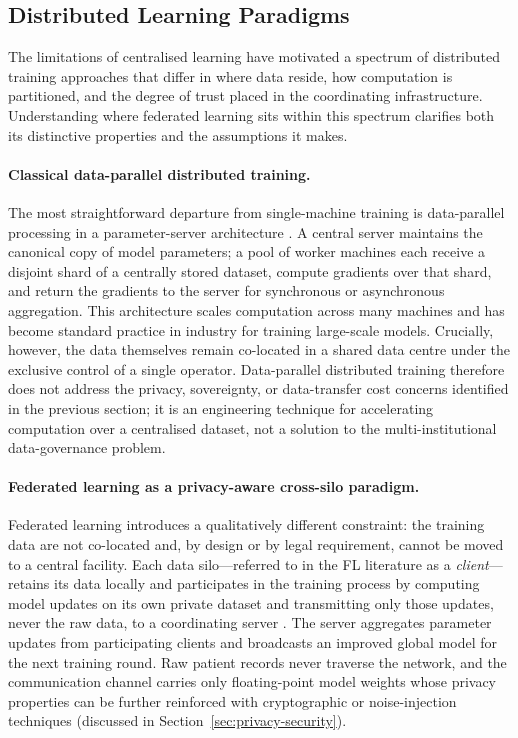 \subsection{Distributed Learning Paradigms}
\label{sec:distributed-paradigms}

The limitations of centralised learning have motivated a spectrum of
distributed training approaches that differ in where data reside, how
computation is partitioned, and the degree of trust placed in the
coordinating infrastructure.
Understanding where federated learning sits within this spectrum
clarifies both its distinctive properties and the assumptions it
makes.

\paragraph{Classical data-parallel distributed training.}
The most straightforward departure from single-machine training is
data-parallel processing in a parameter-server architecture
\cite{dean2012large}.
A central server maintains the canonical copy of model parameters;
a pool of worker machines each receive a disjoint shard of a centrally
stored dataset, compute gradients over that shard, and return the
gradients to the server for synchronous or asynchronous aggregation.
This architecture scales computation across many machines and has
become standard practice in industry for training large-scale models.
Crucially, however, the data themselves remain co-located in a shared
data centre under the exclusive control of a single operator.
Data-parallel distributed training therefore does not address the
privacy, sovereignty, or data-transfer cost concerns identified in the
previous section; it is an engineering technique for accelerating
computation over a centralised dataset, not a solution to the
multi-institutional data-governance problem.

\paragraph{Federated learning as a privacy-aware cross-silo paradigm.}
Federated learning introduces a qualitatively different constraint:
the training data are not co-located and, by design or by legal
requirement, cannot be moved to a central facility.
Each data silo—referred to in the FL literature as a
\emph{client}—retains its data locally and participates in the
training process by computing model updates on its own private dataset
and transmitting only those updates, never the raw data, to a
coordinating server \cite{mcmahan2017communication}.
The server aggregates parameter updates from participating clients and
broadcasts an improved global model for the next training round.
Raw patient records never traverse the network, and the communication
channel carries only floating-point model weights whose privacy
properties can be further reinforced with cryptographic or
noise-injection techniques (discussed in
Section~\ref{sec:privacy-security}).

